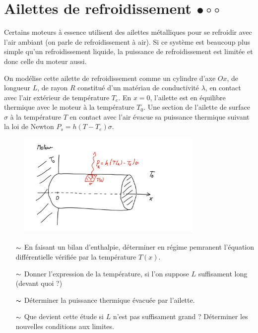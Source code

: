 \documentclass{report}
\begin{document}
\newpage

\section*{Ailettes de refroidissement $\bullet\circ\circ$}

Certains moteurs à essence utilisent des ailettes métalliques pour se refroidir avec l'air ambiant (on parle de refroidissement à air). Si ce système est beaucoup plus simple qu'un refroidissement liquide, la puissance de refroidissement est limitée et donc celle du moteur aussi.

On modélise cette ailette de refroidissement comme un cylindre d'axe $Ox$, de longueur $L$, de rayon $R$ constitué d'un matériau de conductivité $\lambda$, en contact avec l'air extérieur de température $T_e$. En $x=0$, l'ailette est en équilibre thermique avec le moteur à la température $T_0$. Une section de l'ailette de surface $\sigma$ à la température $T$ en contact avec l'air évacue sa puissance thermique suivant la loi de Newton $P_s=h(T-T_e)\sigma$.

\begin{figure}[h!]
\centering
  \includegraphics[width=0.8\textwidth]{ailette.pdf}
\end{figure}

\begin{itemize}

	\item[$\thicksim$] En faisant un bilan d'enthalpie, déterminer en régime pemranent  l'équation différentielle vérifiée par la température $T(x)$.
	
	\item[$\thicksim$] Donner l'expression de la température, si l'on suppose $L$ suffisament long (devant quoi ?)
	
	\item[$\thicksim$] Déterminer la puissance thermique évacuée par l'ailette.
	
	\item[$\thicksim$] Que devient cette étude si $L$ n'est pas suffisament grand ? Déterminer les nouvelles conditions aux limites.

\end{itemize}
\end{document}
